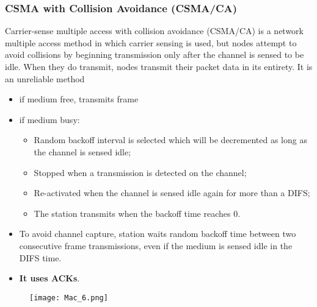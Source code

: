 \documentclass[../resumosRCOM.tex]{subfiles}
\begin{document}
\subsubsection{CSMA with Collision Avoidance (CSMA/CA)}
Carrier-sense multiple access with collision avoidance (CSMA/CA) is a network multiple access method in which carrier sensing is used, but nodes attempt to avoid collisions by beginning transmission only after the channel is sensed to be idle. When they do transmit, nodes transmit their packet data in its entirety.
\newline
It is an unreliable method
\begin{itemize}
    \item if medium free, transmits frame
    \item if medium busy:
    \begin{itemize}
        \item Random backoff interval is selected which will be decremented as long as the channel is sensed idle;
        \item Stopped when a transmission is detected on the channel;
        \item Re-activated when the channel is sensed idle again for more than a DIFS;
        \item The station transmits when the backoff time reaches 0.
    \end{itemize}
    \item To avoid channel capture, station waits random backoff time between two consecutive frame transmissions, even if the medium is sensed idle in the DIFS time.
    \item \textbf{It uses ACKs}.
\end{itemize}
\begin{figure}[H]
    \centering
    \texttt{[image: Mac\_6.png]}
\end{figure}
\end{document}
